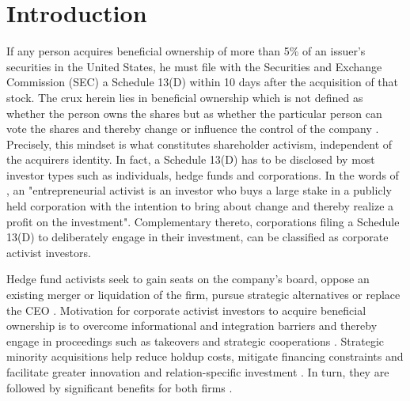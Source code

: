 \documentclass[12pt]{article}
\renewcommand{\baselinestretch}{1.5}
\newcounter{savepage}
\begin{document}
\renewcommand{\baselinestretch}{1.5}\normalsize
\cleardoublepage
{}


\section{Introduction}

\noindent If any person acquires beneficial ownership of more than 5\% of an issuer's securities in the United States, he must file with the Securities and Exchange Commission (SEC) a Schedule 13(D) within 10 days after the acquisition of that stock. The crux herein lies in beneficial ownership which is not defined as whether the person owns the shares but as whether the particular person can vote the shares and thereby change or influence the control of the company \citep[p.24]{Morrison2015}. Precisely, this mindset is what constitutes shareholder activism, independent of the acquirers identity. In fact, a Schedule 13(D) has to be disclosed by most investor types such as individuals, hedge funds and corporations. In the words of \citet[p.187]{Klein2009}, an "entrepreneurial activist is an investor who buys a large stake in a publicly held corporation with the intention to bring about change and thereby realize a profit on the investment". Complementary thereto, corporations filing a Schedule 13(D) to deliberately engage in their investment, can be classified as corporate activist investors.\par
Hedge fund activists seek to gain seats on the company's board, oppose an existing merger or liquidation of the firm, pursue strategic alternatives or replace the CEO \citep[p.188]{Klein2009}. Motivation for corporate activist investors to acquire beneficial ownership is to overcome informational and integration barriers and thereby engage in proceedings such as takeovers and strategic cooperations \citep[p.1]{Huang2017}. Strategic minority acquisitions help reduce holdup costs, mitigate financing constraints and facilitate greater innovation and relation-specific investment \citep[p.825]{Wang2014}. In turn, they are followed by significant benefits for both firms \citep[p.2793]{Allen2000}.\par
\end{document}
